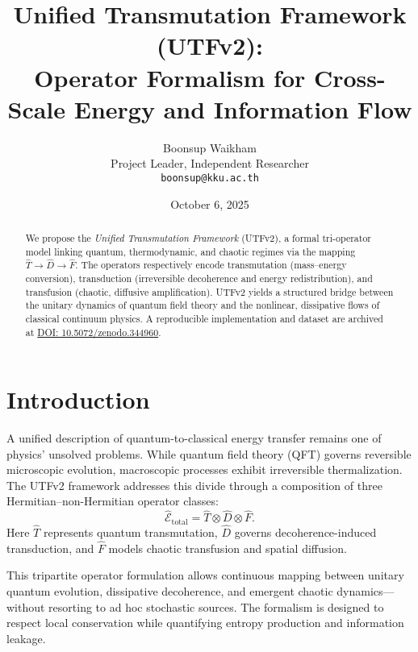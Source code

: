 \documentclass[12pt]{article}
\title{\textbf{Unified Transmutation Framework (UTFv2):\\
Operator Formalism for Cross-Scale Energy and Information Flow}}
\author{
  Boonsup Waikham\\
  \small Project Leader, Independent Researcher\\
  \small \texttt{boonsup@kku.ac.th}
}
\date{October 6, 2025}
\begin{document}
\maketitle

\begin{abstract}
We propose the \emph{Unified Transmutation Framework} (UTFv2), a formal tri-operator model 
linking quantum, thermodynamic, and chaotic regimes via the mapping
$\hat{T} \rightarrow \hat{D} \rightarrow \hat{F}$.
The operators respectively encode transmutation (mass–energy conversion),
transduction (irreversible decoherence and energy redistribution),
and transfusion (chaotic, diffusive amplification).
UTFv2 yields a structured bridge between the unitary dynamics of
quantum field theory and the nonlinear, dissipative flows of
classical continuum physics.
A reproducible implementation and dataset are archived at
\href{https://doi.org/10.5072/zenodo.344960}{DOI: 10.5072/zenodo.344960}.
\end{abstract}


\section{Introduction}

A unified description of quantum-to-classical energy transfer remains
one of physics' unsolved problems.
While quantum field theory (QFT) governs reversible microscopic
evolution, macroscopic processes exhibit irreversible thermalization.
The UTFv2 framework addresses this divide through a composition of
three Hermitian–non-Hermitian operator classes:
\begin{equation}
    \hat{\mathcal{E}}_{\mathrm{total}} = \hat{T} \otimes \hat{D} \otimes \hat{F}.
\end{equation}
Here $\hat{T}$ represents quantum transmutation,
$\hat{D}$ governs decoherence-induced transduction,
and $\hat{F}$ models chaotic transfusion and spatial diffusion.

This tripartite operator formulation allows continuous mapping between
unitary quantum evolution, dissipative decoherence, and emergent chaotic
dynamics—without resorting to ad hoc stochastic sources.
The formalism is designed to respect local conservation while
quantifying entropy production and information leakage.
\end{document}
